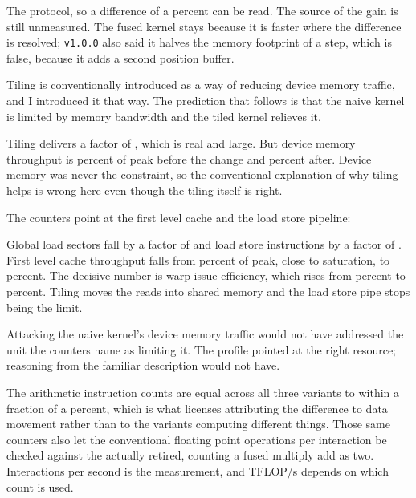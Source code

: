  The protocol, so a difference of a percent can be read. The source of
the gain is still unmeasured. The fused kernel stays because it is faster where the difference
is resolved; \texttt{v1.0.0} also said it halves the memory footprint of a step, which is false,
because it adds a second position buffer.


 Tiling is conventionally introduced as a way of
reducing device memory traffic, and I introduced it that way. The prediction
that follows is that the naive kernel is limited by memory bandwidth and the
tiled kernel relieves it.

 Tiling delivers a factor of \TilingSpeedupAtMaxN{},
which is real and large. But device memory throughput is
\NaiveDramPct{} percent of peak before the change and \TiledDramPct{} percent
after. Device memory was never the constraint, so the conventional explanation
of why tiling helps is wrong here even though the tiling itself is right.

 The counters point at the first level cache
and the load store pipeline:

\begin{center}

\end{center}

Global load sectors fall by a factor of \SectorReduction{} and load store
instructions by a factor of \LsuReduction{}. First level cache throughput falls
from \NaiveLoneTexPct{} percent of peak, close to saturation, to
\TiledLoneTexPct{} percent. The decisive number is warp issue efficiency, which
rises from \NaiveIssuePct{} percent to \TiledIssuePct{} percent. Tiling moves the reads into
shared memory and the load store pipe stops being the limit.

 Attacking the naive kernel's device memory traffic would
not have addressed the unit the counters name as limiting it. The profile pointed at the right
resource; reasoning from the familiar description would not have.

 The arithmetic instruction counts are equal across all three
variants to within a fraction of a percent, which is what licenses attributing
the difference to data movement rather than to the variants computing different
things. Those same counters also let the conventional
\ConventionalFlopsPerInteraction{} floating point operations per interaction be checked
against the \MeasuredFlopsPerInteraction{} actually retired, counting a fused multiply add as
two. Interactions per second is the measurement, and TFLOP/s depends on which count is used.

